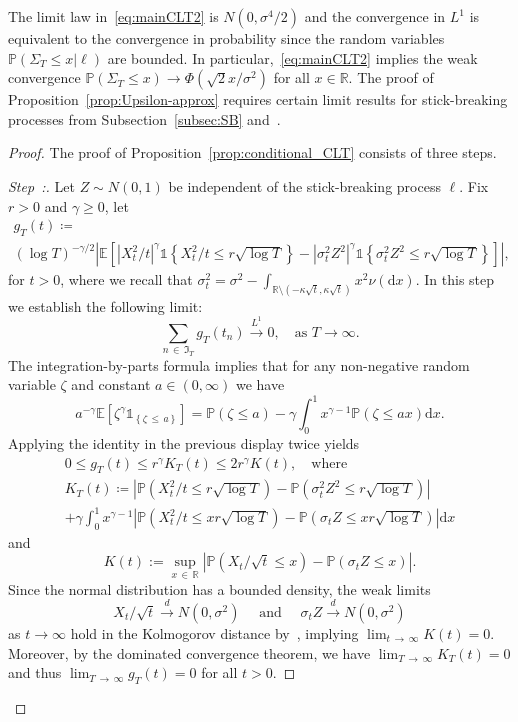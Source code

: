 \documentclass[10pt]{amsart}
\theoremstyle{definition}\newtheorem{defi}[theo]{Definition}\newtheorem{rema}[theo]{Remark}\newtheorem{exam}[theo]{Example}\newtheorem{exem}[theo]{Example}\newtheorem{nota}[theo]{Notation}
\newcommand\R{\mathbb{R}}
\newcommand\E{\mathds{E}}
\newcommand\p{\mathds{P}}
\newcommand\1{\mathds{1}}
\newcommand\D{\mathrm{d}}
\newcommand\GI{\mathfrak{I}}
\newcommand\cid{\xrightarrow{d}}
\newcommand\ciL{\xrightarrow{L^1}}
\newcounter{stepcount}
\newenvironment{step}{\refstepcounter{stepcount}\begin{proof}[Step~\thestepcount:]}{\let\qed\relax\end{proof}}
\begin{document}
The limit law in~\eqref{eq:mainCLT2} is $N(0,\sigma^4/2)$ and the convergence in $L^1$ is equivalent to the convergence in probability since the random variables $\p(\Sigma_T\le x|\ell)$ are bounded. In particular,~\eqref{eq:mainCLT2} implies the weak convergence $\p(\Sigma_T\le x)\to \Phi(\sqrt{2}x/\sigma^2)$ for all $x\in\R$. The proof of Proposition~\ref{prop:Upsilon-approx} requires certain limit results for stick-breaking processes from Subsection~\ref{subsec:SB} and~\cite[Theorem~1.1]{MR4285923}.


\begin{proof}
The proof of Proposition~\ref{prop:conditional_CLT} consists of three steps.

\begin{step}\label{proof-prop2.9-step1}
Let $Z \sim N(0,1)$ be independent of the stick-breaking process $\ell$. Fix $r>0$ and $\gamma\ge 0$, let
\begin{multline*}
g_T(t)\coloneqq\\
(\log T)^{-\gamma/2}\left|\E\left[\left|X_t^2/t\right|^{\gamma}\1{\left\{X_t^2/t\le r \sqrt{\log T}\right\}} - \left|\sigma_t^2 Z^2\right|^{\gamma}\1{\left\{\sigma_t^2 Z^2\le r \sqrt{\log T}\right\}}\right]\right|,
\end{multline*}
for $t>0$, where we recall that $\sigma_t^2=\sigma^2-\int_{\R\setminus(-\kappa\sqrt{t},\kappa\sqrt{t})}x^2\nu(\D x)$. In this step we establish the following limit:
\begin{equation}\label{eq:dctfordiff}
\sum_{n\,\in\,\GI_T} g_T(t_n)\ciL 0,
\quad\text{as }T\to\infty.
\end{equation}
The integration-by-parts formula implies that for any non-negative random variable $\zeta$ and constant $a\in(0,\infty)$ we have
\[
a^{-\gamma}\E \left[\zeta^\gamma\1 _{\left\{\zeta\,\le\,a\right\}}\right] =\p\left(\zeta\le a\right) -\gamma \int_0^1 x^{\gamma-1}
\p \left(\zeta \le ax\right)\D x.
\]
Applying the identity in the previous display twice yields
\begin{multline}\label{eq:summablegDCT}
0\le g_T(t)
\le r^{\gamma}K_T(t)
\le 2r^{\gamma}K(t),
\quad\text{where}\\
 K_T(t) \coloneqq \left|\p\left(X_t^2/t\le r\sqrt{\log T}\right) -\p\left(\sigma_t^2 Z^2\le r\sqrt{\log T}\right)\right| \\
+\gamma\int_0^1x^{\gamma-1}\left|\p\left(X_{t}^2/t\le xr\sqrt{\log T}\right)-\p\left(\sigma_t Z\le xr\sqrt{\log T}\right)\right|\D x
\end{multline}
and
\[
K(t):=\sup_{x\,\in\,\R}\left|\p\left(X_t/\sqrt{t}\le x\right)-\p\left(\sigma_t Z\le x\right)\right|.
\]
Since the normal distribution has a bounded density, the weak limits 
\[
X_t/\sqrt{t}\cid N\left(0,\sigma^2\right)\quad\text{ and }\quad\sigma_tZ\cid N\left(0,\sigma^2\right)
\]
 as $t\to\infty$ hold in the Kolmogorov distance by~\cite[1.8.31~\&~1.8.32,~p.~43]{MR1353441}, implying $\lim_{t\,\to\,\infty}K(t)=0$. Moreover, by the dominated convergence theorem, we have $\lim_{T\,\to\,\infty}K_T(t)=0$ and thus $\lim_{T\,\to\,\infty}g_T(t)=0$ for all $t>0$.



\end{step}
\end{proof}
\end{document}
